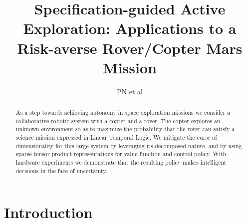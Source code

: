 \documentclass[conference]{IEEEtran}
\begin{document}



\title{\huge Specification-guided Active Exploration: Applications to a Risk-averse Rover/Copter Mars Mission}



\author{PN et al}

\maketitle

\begin{abstract}
  As a step towards achieving autonomy in space exploration missions we consider a collaborative robotic system with a copter and a rover. The copter explores an unknown environment so as to maximize the probability that the rover can satisfy a science mission expressed in Linear Temporal Logic. We mitigate the curse of dimensionality for this large system by leveraging its decomposed nature, and by using sparse tensor product representations for value function and control policy. With hardware experiments we demonstrate that the resulting policy makes intelligent decisions in the face of uncertainty.
\end{abstract}

\IEEEpeerreviewmaketitle

	

\section{Introduction}
\end{document}
